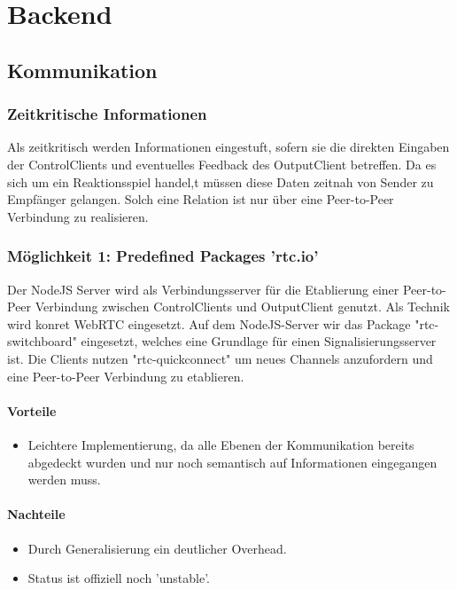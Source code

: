 \chapter{Backend}

\section{Kommunikation}

\subsection{Zeitkritische Informationen}
Als zeitkritisch werden Informationen eingestuft, sofern sie die direkten Eingaben der ControlClients und eventuelles Feedback des OutputClient betreffen. Da es sich um ein Reaktionsspiel handel,t müssen diese Daten zeitnah von Sender zu Empfänger gelangen. Solch eine Relation ist nur über eine Peer-to-Peer Verbindung zu realisieren.

\subsection{Möglichkeit 1: Predefined Packages 'rtc.io'}
Der NodeJS Server wird als Verbindungsserver für die Etablierung einer Peer-to-Peer Verbindung zwischen ControlClients und OutputClient genutzt. Als Technik wird konret WebRTC eingesetzt. Auf dem NodeJS-Server wir das Package "rtc-switchboard" eingesetzt, welches eine Grundlage für einen  Signalisierungsserver ist. Die Clients nutzen "rtc-quickconnect" um neues Channels anzufordern und eine Peer-to-Peer Verbindung zu etablieren.



\subsubsection{Vorteile}
\begin{itemize}
\item
Leichtere Implementierung, da alle Ebenen der Kommunikation bereits abgedeckt wurden und nur noch semantisch auf Informationen eingegangen werden muss.
\end{itemize}

\subsubsection{Nachteile}
\begin{itemize}
\item
Durch Generalisierung ein deutlicher Overhead.

\item
Status ist offiziell noch 'unstable'.
\end{itemize}

